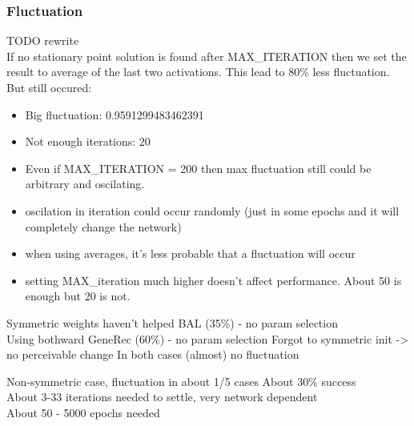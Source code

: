 \subsubsection*{Fluctuation} 
\label{sec:generec-fluctuation}

TODO rewrite \\ 

If no stationary point solution is found after MAX\_ITERATION then we set the result to average of the last two activations. This lead to 80\% less fluctuation. But still occured: 
\begin{itemize}
\item Big fluctuation: 0.9591299483462391
\item Not enough iterations: 20
\item Even if MAX\_ITERATION = 200 then max fluctuation still could be arbitrary and oscilating.
\end{itemize} 

\begin{itemize} 
  \item oscilation in iteration could occur randomly (just in some epochs and it will completely change the network) 
  \item when using averages, it's less probable that a fluctuation will occur 
  \item setting MAX\_iteration much higher doesn't affect performance. About 50 is enough but 20 is not. 
\end{itemize} 
  
Symmetric weights haven't helped BAL (35\%) - no param selection \\ 
Using bothward GeneRec (60\%) - no param selection 
  Forgot to symmetric init -> no perceivable change 
In both cases (almost) no fluctuation 

Non-symmetric case, fluctuation in about 1/5 cases 
  About 30\% success \\
  About 3-33 iterations needed to settle, very network dependent  \\
  About 50 - 5000 epochs needed  \\

